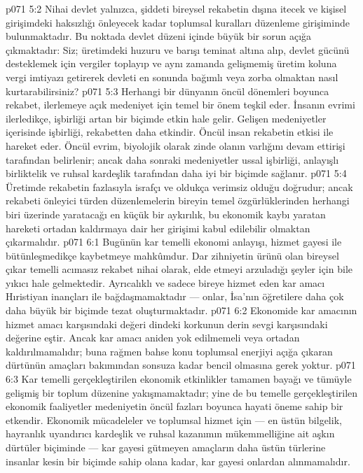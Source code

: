 \vs p071 5:2 Nihai devlet yalnızca, şiddeti bireysel rekabetin dışına itecek ve kişisel girişimdeki haksızlığı önleyecek kadar toplumsal kuralları düzenleme girişiminde bulunmaktadır. Bu noktada devlet düzeni içinde büyük bir sorun açığa çıkmaktadır: Siz; üretimdeki huzuru ve barışı teminat altına alıp, devlet gücünü desteklemek için vergiler toplayıp ve aynı zamanda gelişmemiş üretim koluna vergi imtiyazı getirerek devleti en sonunda bağımlı veya zorba olmaktan nasıl kurtarabilirsiniz?
\vs p071 5:3 Herhangi bir dünyanın öncül dönemleri boyunca rekabet, ilerlemeye açık medeniyet için temel bir önem teşkil eder. İnsanın evrimi ilerledikçe, işbirliği artan bir biçimde etkin hale gelir. Gelişen medeniyetler içerisinde işbirliği, rekabetten daha etkindir. Öncül insan rekabetin etkisi ile hareket eder. Öncül evrim, biyolojik olarak zinde olanın varlığını devam ettirişi tarafından belirlenir; ancak daha sonraki medeniyetler ussal işbirliği, anlayışlı birliktelik ve ruhsal kardeşlik tarafından daha iyi bir biçimde sağlanır.
\vs p071 5:4 Üretimde rekabetin fazlasıyla israfçı ve oldukça verimsiz olduğu doğrudur; ancak rekabeti önleyici türden düzenlemelerin bireyin temel özgürlüklerinden herhangi biri üzerinde yaratacağı en küçük bir aykırılık, bu ekonomik kaybı yaratan hareketi ortadan kaldırmaya dair her girişimi kabul edilebilir olmaktan çıkarmalıdır.
\vs p071 6:1 Bugünün kar temelli ekonomi anlayışı, hizmet gayesi ile bütünleşmedikçe kaybetmeye mahkûmdur. Dar zihniyetin ürünü olan bireysel çıkar temelli acımasız rekabet nihai olarak, elde etmeyi arzuladığı şeyler için bile yıkıcı hale gelmektedir. Ayrıcalıklı ve sadece bireye hizmet eden kar amacı Hıristiyan inançları ile bağdaşmamaktadır --- onlar, İsa’nın öğretilere daha çok daha büyük bir biçimde tezat oluşturmaktadır.
\vs p071 6:2 Ekonomide kar amacının hizmet amacı karşısındaki değeri dindeki korkunun derin sevgi karşısındaki değerine eştir. Ancak kar amacı aniden yok edilmemeli veya ortadan kaldırılmamalıdır; buna rağmen bahse konu toplumsal enerjiyi açığa çıkaran dürtünün amaçları bakımından sonsuza kadar bencil olmasına gerek yoktur.
\vs p071 6:3 Kar temelli gerçekleştirilen ekonomik etkinlikler tamamen bayağı ve tümüyle gelişmiş bir toplum düzenine yakışmamaktadır; yine de bu temelle gerçekleştirilen ekonomik faaliyetler medeniyetin öncül fazları boyunca hayati öneme sahip bir etkendir. Ekonomik mücadeleler ve toplumsal hizmet için --- en üstün bilgelik, hayranlık uyandırıcı kardeşlik ve ruhsal kazanımın mükemmelliğine ait aşkın dürtüler biçiminde --- kar gayesi gütmeyen amaçların daha üstün türlerine insanlar kesin bir biçimde sahip olana kadar, kar gayesi onlardan alınmamalıdır.
